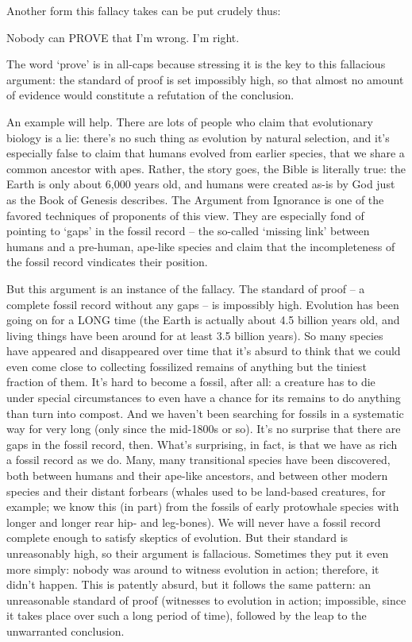 Another form this fallacy takes can be put crudely thus:

Nobody can PROVE that I'm wrong.
I'm right.

The word `prove' is in all-caps because stressing it is the key to this fallacious argument: the
standard of proof is set impossibly high, so that almost no amount of evidence would constitute a
refutation of the conclusion.

An example will help. There are lots of people who claim that evolutionary biology is a lie: there's
no such thing as evolution by natural selection, and it's especially false to claim that humans
evolved from earlier species, that we share a common ancestor with apes. Rather, the story goes,
the Bible is literally true: the Earth is only about 6,000 years old, and humans were created as-is
by God just as the Book of Genesis describes. The Argument from Ignorance is one of the favored
techniques of proponents of this view. They are especially fond of pointing to `gaps' in the fossil
record -- the so-called `missing link' between humans and a pre-human, ape-like species and
claim that the incompleteness of the fossil record vindicates their position.

But this argument is an instance of the fallacy. The standard of proof -- a complete fossil record
without any gaps -- is impossibly high. Evolution has been going on for a LONG time (the Earth
is actually about 4.5 billion years old, and living things have been around for at least 3.5 billion
years). So many species have appeared and disappeared over time that it's absurd to think that we
could even come close to collecting fossilized remains of anything but the tiniest fraction of them.
It's hard to become a fossil, after all: a creature has to die under special circumstances to even have
a chance for its remains to do anything than turn into compost. And we haven't been searching for
fossils in a systematic way for very long (only since the mid-1800s or so). It's no surprise that
there are gaps in the fossil record, then. What's surprising, in fact, is that we have as rich a fossil
record as we do. Many, many transitional species have been discovered, both between humans and
their ape-like ancestors, and between other modern species and their distant forbears (whales used
to be land-based creatures, for example; we know this (in part) from the fossils of early protowhale species with longer and longer rear hip- and leg-bones).
We will never have a fossil record complete enough to satisfy skeptics of evolution. But their
standard is unreasonably high, so their argument is fallacious. Sometimes they put it even more
simply: nobody was around to witness evolution in action; therefore, it didn't happen. This is
patently absurd, but it follows the same pattern: an unreasonable standard of proof (witnesses to
evolution in action; impossible, since it takes place over such a long period of time), followed by
the leap to the unwarranted conclusion.

